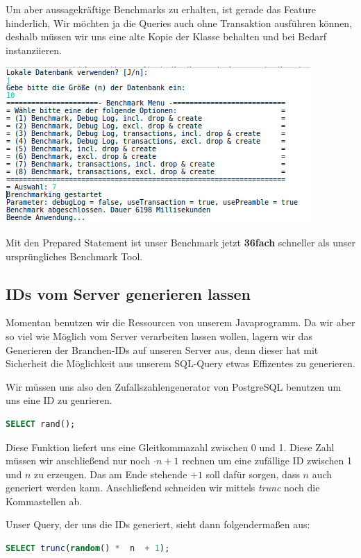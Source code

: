Um aber aussagekräftige Benchmarks zu erhalten, ist gerade das Feature
hinderlich, Wir möchten ja die Queries auch ohne Transaktion ausführen können,
deshalb müssen wir uns eine alte Kopie der Klasse behalten und bei Bedarf
instanziieren.
\begin{center}
\includegraphics[scale=0.8]{Bilder/Auswahl_016.png}
\end{center}
Mit den Prepared Statement ist unser Benchmark jetzt \textbf{36fach} schneller
als unser ursprüngliches Benchmark Tool.

\subsection{IDs vom Server generieren lassen}
Momentan benutzen wir die Ressourcen von unserem Javaprogramm. Da wir aber so
viel wie Möglich vom Server verarbeiten lassen wollen, lagern wir das Generieren
der Branchen-IDs auf unseren Server aus, denn dieser hat mit Sicherheit die
Möglichkeit aus unserem SQL-Query etwas Effizentes zu generieren.

Wir müssen uns also den Zufallszahlengenerator von PostgreSQL benutzen um uns
eine ID zu genrieren.

\begin{lstlisting}[language=sql]
SELECT rand();
\end{lstlisting}

Diese Funktion liefert uns eine Gleitkommazahl zwischen 0 und 1. Diese Zahl
müssen wir anschließend nur noch $ \cdot  n + 1 $ rechnen um eine zufällige ID
zwischen 1 und $n$ zu erzeugen. Das am Ende stehende $ + 1$ soll dafür sorgen,
dass $n$ auch generiert werden kann. Anschließend schneiden wir mittels \textit{trunc} noch
die Kommastellen ab.

Unser Query, der uns die IDs generiert, sieht dann folgendermaßen aus:
\begin{lstlisting}[language=sql]
SELECT trunc(random() *  n  + 1);
\end{lstlisting}

